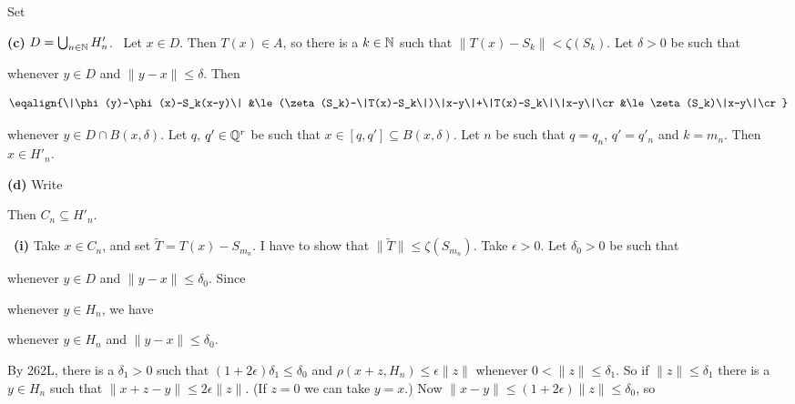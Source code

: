 {


Set


\medskip

{\bf (c)} $D=\bigcup_{n\in\Bbb N}H'_n$.   \Prf\ Let $x\in D$.   Then
$T(x)\in A$, so there is a $k\in\Bbb N$ such that
$\|T(x)-S_k\|<\zeta(S_k)$.   Let $\delta>0$ be such that


\noindent whenever $y\in D$ and $\|y-x\|\le\delta$.   Then

$$\eqalign{\|\phi(y)-\phi(x)-S_k(x-y)\|
&\le(\zeta(S_k)-\|T(x)-S_k\|)\|x-y\|+\|T(x)-S_k\|\|x-y\|\cr
&\le\zeta(S_k)\|x-y\|\cr}$$

\noindent whenever $y\in D\cap B(x,\delta)$.   Let $q$, $q'\in\Bbb Q^r$
be such that $x\in[q,q']\subseteq B(x,\delta)$.   Let $n$ be such that
$q=q_n$, $q'=q'_n$ and $k=m_n$.   Then $x\in H'_n$.\ \Qed

\medskip

{\bf (d)} Write


\noindent Then $C_n\subseteq H'_n$.

\medskip

\Prf\ {\bf (i)} Take $x\in C_n$, and set $\tilde T=T(x)-S_{m_n}$.   I
have
to show that $\|\tilde T\|\le\zeta(S_{m_n})$.   Take $\epsilon>0$.   Let
$\delta_0>0$ be such that


\noindent whenever $y\in D$ and $\|y-x\|\le\delta_0$.   Since


\noindent whenever $y\in H_n$, we have


\noindent whenever $y\in H_n$ and $\|y-x\|\le\delta_0$.

\medskip

 By 262L, there is a $\delta_1>0$ such that
$(1+2\epsilon)\delta_1\le\delta_0$ and $\rho(x+z,H_n)\le\epsilon\|z\|$
whenever $0<\|z\|\le\delta_1$.   So if $\|z\|\le\delta_1$ there is a
$y\in
H_n$ such that $\|x+z-y\|\le 2\epsilon\|z\|$.   (If $z=0$ we can take
$y=x$.)   Now $\|x-y\|\le (1+2\epsilon)\|z\|\le\delta_0$, so

}
